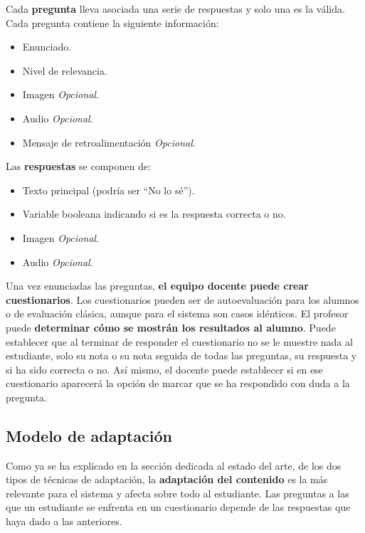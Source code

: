 Cada \textbf{pregunta} lleva asociada una serie de respuestas y solo una es la válida. Cada pregunta contiene la siguiente información:

\begin{itemize}
	\item Enunciado.
	\item Nivel de relevancia.
	\item Imagen \textit{Opcional}.
	\item Audio \textit{Opcional}.
	\item Mensaje de retroalimentación \textit{Opcional}.
\end{itemize}

Las \textbf{respuestas} se componen de:

\begin{itemize}
	\item Texto principal (podría ser ``No lo sé'').
	\item Variable booleana indicando si es la respuesta correcta o no.
	\item Imagen \textit{Opcional}.
	\item Audio \textit{Opcional}.
\end{itemize}

Una vez enunciadas las preguntas, \textbf{el equipo docente puede crear cuestionarios}. Los cuestionarios pueden ser de autoevaluación para los alumnos o de evaluación clásica, aunque para el sistema son casos idénticos. El profesor puede \textbf{determinar cómo se mostrán los resultados al alumno}. Puede establecer que al terminar de responder el cuestionario no se le muestre nada al estudiante, solo su nota o su nota seguida de todas las preguntas, su respuesta y si ha sido correcta o no. Así mismo, el docente puede establecer si en ese cuestionario aparecerá la opción de marcar que se ha respondido con duda a la pregunta.


\subsection{Modelo de adaptación\label{sec:modelo adapatacion}}

Como ya se ha explicado en la sección dedicada al estado del arte, de los dos tipos de técnicas de adaptación, la \textbf{adaptación del contenido} es la más relevante para el sistema y afecta sobre todo al estudiante. Las preguntas a las que un estudiante se enfrenta en un cuestionario depende de las respuestas que haya dado a las anteriores.

